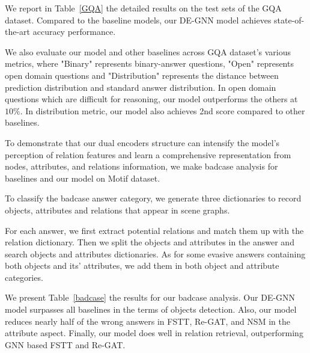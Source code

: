 \documentclass[letterpaper]{article} %
\begin{document}
We report in Table~\ref{GQA} the detailed results on the test sets of the GQA dataset. Compared to the baseline models, our DE-GNN model achieves state-of-the-art accuracy performance. 

We also evaluate our model and other baselines across GQA dataset's various metrics, where "Binary" represents binary-answer questions, "Open" represents open domain questions and "Distribution" represents the distance between prediction distribution and standard answer distribution. In open domain questions which are difficult for reasoning, our model outperforms the others at $10\%$. In distribution metric, our model also achieves 2nd score compared to other baselines.

To demonstrate that our dual encoders structure can intensify the model's perception of relation features and learn a comprehensive representation from nodes, attributes, and relations information, we make badcase analysis for baselines and our model on Motif dataset.

To classify the badcase answer category, we generate three dictionaries to record objects, attributes and relations that appear in scene graphs.

For each answer, we first extract potential relations and match them up with the relation dictionary. Then we split the objects and attributes in the answer and search objects and attributes dictionaries. As for some evasive answers containing both objects and its' attributes, we add them in both object and attribute categories. 

We present Table~\ref{badcase} the results for our badcase analysis. Our DE-GNN model surpasses all baselines in the terms of objects detection. Also, our model reduces nearly half of the wrong answers in FSTT, Re-GAT, and NSM in the attribute aspect. Finally, our model does well in relation retrieval, outperforming GNN based FSTT and Re-GAT.
\end{document}
